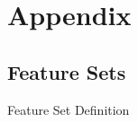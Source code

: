 \section{Appendix}

\subsection{Feature Sets}

\begin{table}[H]
    \centering
    
    \caption[Feature Set Definition]{Feature Set Definition}
    \label{tab:feature-set-definition}
\end{table}